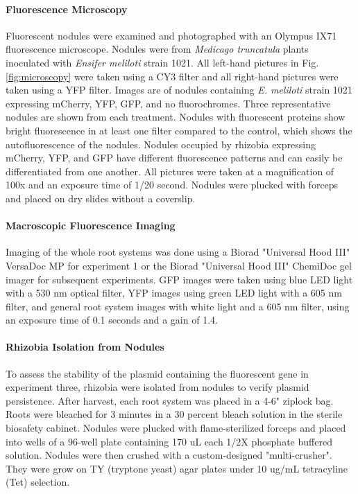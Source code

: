 \documentclass[12pt]{article}
\begin{document}
\begin{doublespace}
\paragraph{Fluorescence Microscopy} 
Fluorescent nodules were examined and photographed with an Olympus IX71 fluorescence microscope. Nodules were from \textit{Medicago truncatula} plants inoculated with \textit{Ensifer meliloti} strain 1021. All left-hand pictures in Fig. \ref{fig:microscopy} were taken using a CY3 filter and all right-hand pictures were taken using a YFP filter. Images are of nodules containing \textit{E. meliloti} strain 1021 expressing mCherry, YFP, GFP, and no fluorochromes. Three representative nodules are shown from each treatment. Nodules with fluorescent proteins show bright fluorescence in at least one filter compared to the control, which shows the autofluorescence of the nodules. Nodules occupied by rhizobia expressing mCherry, YFP, and GFP have different fluorescence patterns and can easily  be differentiated from one another. All pictures were taken at a magnification  of 100x and an exposure time of 1/20 second. Nodules were plucked with forceps and placed on dry slides without a coverslip. 

\paragraph{Macroscopic Fluorescence Imaging}
Imaging of the whole root systems was done using a Biorad "Universal Hood III" VersaDoc MP for experiment 1 or the Biorad "Universal Hood III" ChemiDoc gel imager for subsequent experiments. GFP images were taken using blue LED light with a 530 nm optical filter, YFP images using green LED light with a 605 nm filter, and general root system images with white light and a 605 nm filter, using an exposure time of 0.1 seconds and a gain of 1.4. 

\paragraph{Rhizobia Isolation from Nodules}
To assess the stability of the plasmid containing the fluorescent gene in experiment three, rhizobia were isolated from nodules to verify plasmid persistence. After harvest, each root system was placed in a 4-6" ziplock bag. Roots were bleached for 3 minutes in a 30 percent bleach solution in the sterile biosafety cabinet. Nodules were plucked with flame-sterilized forceps and placed into wells of a 96-well plate containing 170 uL each 1/2X phosphate buffered solution. Nodules were then crushed with a custom-designed "multi-crusher". They were grow on TY (tryptone yeast) agar plates under 10 ug/mL tetracyline (Tet) selection. 


\end{doublespace}
\end{document}
